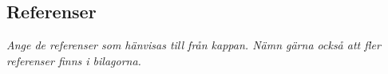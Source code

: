 \documentclass[11pt]{article}
\begin{document}
\begin{flushleft}
\pagebreak

\section{Referenser}
\textit{Ange de referenser som hänvisas till från kappan. Nämn gärna också att fler referenser finns i bilagorna.}

\pagebreak
{}
%
%

\pagebreak


\appendix

\end{flushleft}
\end{document}
